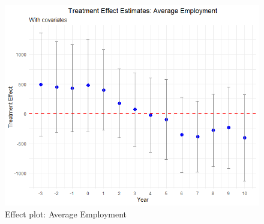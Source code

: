 \begin{figure}[htbp]
    \centering
    \includegraphics[width=\textwidth,keepaspectratio]{images/tes_emp.png}
    \caption{Effect plot: Average Employment}
    \label{fig:tes_gs_app}
\end{figure}

